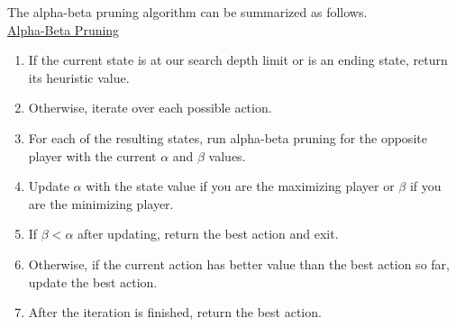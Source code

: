 \documentclass[12pt, letterpaper]{article}
\begin{document}
The alpha-beta pruning algorithm can be summarized as follows. \\[0.2cm]
\underline{Alpha-Beta Pruning}
\begin{enumerate}
    \item If the current state is at our search depth limit or is an ending state, return its heuristic value.
    \item Otherwise, iterate over each possible action.
    \item For each of the resulting states, run alpha-beta pruning for the opposite player with the current $\alpha$ and $\beta$ values.
    \item Update $\alpha$ with the state value if you are the maximizing player or $\beta$ if you are the minimizing player.
    \item If $\beta < \alpha$ after updating, return the best action and exit.
    \item Otherwise, if the current action has better value than the best action so far, update the best action.
    \item After the iteration is finished, return the best action.
\end{enumerate}
\end{document}
